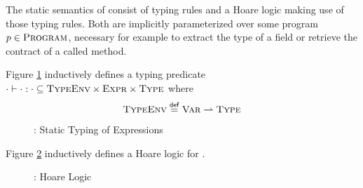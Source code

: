 The static semantics of \svlidf consist of typing rules and a Hoare logic making use of those typing rules.
Both are implicitly parameterized over some program $p \in \textup{\textsc{Program}}$, necessary for example to extract the type of a field or retrieve the contract of a called method.

Figure \ref{fig:svl-sem-stat-typing} inductively defines a typing predicate ${\cdot} \vdash {\cdot} : {\cdot} \subseteq \textup{\textsc{TypeEnv}} \times \textup{\textsc{Expr}} \times \textup{\textsc{Type}}$ where
$$\textup{\textsc{TypeEnv}} \overset{\textup{\textmd{\textsf{def}}}}{=} \textup{\textsc{Var}} \rightharpoonup \textup{\textsc{Type}}$$

\begin{figure}[h]
    
    \caption{\svlidf: Static Typing of Expressions}
    \label{fig:svl-sem-stat-typing}
\end{figure}

Figure \ref{fig:svl-sem-stat-hoare} inductively defines a Hoare logic for \svlidf.
\begin{figure}[h]
    
    \caption{\svlidf: Hoare Logic} 
    \label{fig:svl-sem-stat-hoare}
\end{figure}


